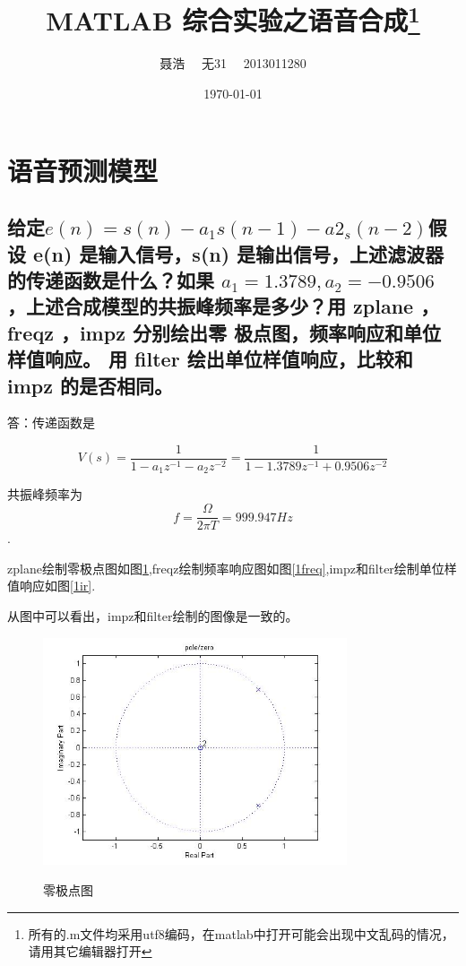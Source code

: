 \documentclass{ctexart}
\title{MATLAB 综合实验之语音合成\footnote{所有的.m文件均采用utf8编码，在matlab中打开可能会出现中文乱码的情况，请用其它编辑器打开}}
\author{聂浩~~ 无31~~ 2013011280}
\date{\today}
\begin{document}
\maketitle
\section{语音预测模型}
\subsection{
    给定$e(n) = s(n)-a_1s(n-1)-a2_s(n-2)$假设 e(n) 是输入信号，s(n)
    是输出信号，上述滤波器的传递函数是什么？如果 $a_1 = 1.3789,
    a_2 =-0.9506$ ，上述合成模型的共振峰频率是多少？用 zplane ，
    freqz ，impz 分别绘出零 极点图，频率响应和单位样值响应。
用 filter 绘出单位样值响应，比较和 impz 的是否相同。}

答：传递函数是

\[V(s)=\frac{1}{1-a_1z^{-1}-a_2z^{-2}}=\frac{1}{1-1.3789z^{-1}+0.9506z^{-2}}\]

共振峰频率为\[f=\frac{\Omega}{2\pi T}=999.947Hz\].

zplane绘制零极点图如图\ref{1zp},freqz绘制频率响应图如图\ref{1freq},impz和filter绘制单位样值响应如图\ref{1ir}.

从图中可以看出，impz和filter绘制的图像是一致的。

\begin{figure}
    \centering
    \includegraphics[width=0.8\textwidth]{1_zp.jpg}\\
    \caption{零极点图\label{1zp}}
\end{figure}
\end{document}
